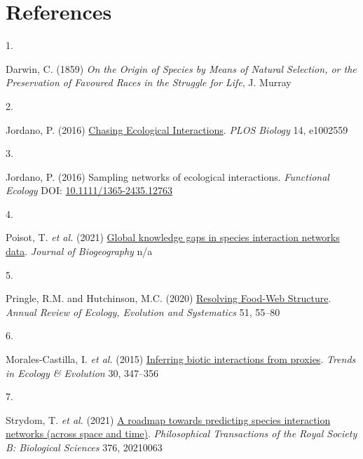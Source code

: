 \documentclass[
]{article}
\newlength{\cslhangindent}
\newlength{\csllabelwidth}
\newenvironment{CSLReferences}[2] %
 {\begin{list}{}{%
  \setlength{\itemindent}{0pt}
  \setlength{\leftmargin}{0pt}
  \setlength{\parsep}{0pt}
  \ifodd #1
   \setlength{\leftmargin}{\cslhangindent}
   \setlength{\itemindent}{-1\cslhangindent}
  \fi
  \setlength{\itemsep}{#2\baselineskip}}}
 {\end{list}}
\newcommand{\CSLLeftMargin}[1]{\parbox[t]{\csllabelwidth}{\strut#1\strut}}
\newcommand{\CSLRightInline}[1]{\parbox[t]{\linewidth - \csllabelwidth}{\strut#1\strut}}
\begin{document}
\section*{References}\label{references}

\label{refs}
\begin{CSLReferences}{0}{0}
\CSLLeftMargin{1. }%
\CSLRightInline{Darwin, C. (1859) \emph{On the {Origin} of {Species} by
{Means} of {Natural Selection}, or the {Preservation} of {Favoured
Races} in the {Struggle} for {Life}}, J. Murray}

\CSLLeftMargin{2. }%
\CSLRightInline{Jordano, P. (2016)
\href{https://doi.org/10.1371/journal.pbio.1002559}{Chasing {Ecological
Interactions}}. \emph{PLOS Biology} 14, e1002559}

\CSLLeftMargin{3. }%
\CSLRightInline{Jordano, P. (2016) Sampling networks of ecological
interactions. \emph{Functional Ecology} DOI:
\href{https://doi.org/10.1111/1365-2435.12763}{10.1111/1365-2435.12763}}

\CSLLeftMargin{4. }%
\CSLRightInline{Poisot, T. \emph{et al.} (2021)
\href{https://doi.org/10.1111/jbi.14127}{Global knowledge gaps in
species interaction networks data}. \emph{Journal of Biogeography} n/a}

\CSLLeftMargin{5. }%
\CSLRightInline{Pringle, R.M. and Hutchinson, M.C. (2020)
\href{https://doi.org/10.1146/annurev-ecolsys-110218-024908}{Resolving
{Food-Web Structure}}. \emph{Annual Review of Ecology, Evolution and
Systematics} 51, 55--80}

\CSLLeftMargin{6. }%
\CSLRightInline{Morales-Castilla, I. \emph{et al.} (2015)
\href{https://doi.org/10.1016/j.tree.2015.03.014}{Inferring biotic
interactions from proxies}. \emph{Trends in Ecology \& Evolution} 30,
347--356}

\CSLLeftMargin{7. }%
\CSLRightInline{Strydom, T. \emph{et al.} (2021)
\href{https://doi.org/10.1098/rstb.2021.0063}{A roadmap towards
predicting species interaction networks (across space and time)}.
\emph{Philosophical Transactions of the Royal Society B: Biological
Sciences} 376, 20210063}


\end{CSLReferences}
\end{document}
